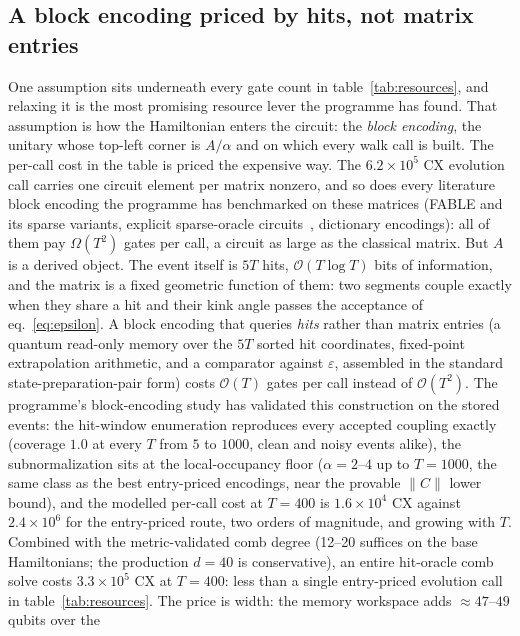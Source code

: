 \documentclass[11pt,a4paper]{article}
\begin{document}
\subsection{A block encoding priced by hits, not matrix entries}
\label{sec:limits:blockencoding}

One assumption sits underneath every gate count in
table~\ref{tab:resources}, and relaxing it is the most promising
resource lever the programme has found. That assumption is how the
Hamiltonian enters the circuit: the \emph{block encoding}, the
unitary whose top-left corner is $A/\alpha$ and on which every
walk call is built. The per-call cost in the table is priced the
expensive way. The
$6.2\times10^{5}$ CX evolution call carries one circuit element per matrix nonzero, and so does every literature block encoding the
programme has benchmarked on these matrices (FABLE and its sparse
variants, explicit sparse-oracle circuits~\cite{camps2023},
dictionary encodings): all of them pay $\Omega(T^{2})$ gates per
call, a circuit as large as the classical matrix. But $A$ is a
derived object. The event itself is $5T$ hits,
$\mathcal{O}(T\log T)$ bits of information, and the matrix is a
fixed geometric function of them: two segments couple exactly when
they share a hit and their kink angle passes the acceptance of
eq.~\eqref{eq:epsilon}. A block encoding that queries \emph{hits}
rather than matrix entries (a quantum read-only memory over the
$5T$ sorted hit coordinates, fixed-point extrapolation arithmetic,
and a comparator against $\varepsilon$, assembled in the standard
state-preparation-pair form) costs $\mathcal{O}(T)$ gates per
call instead of $\mathcal{O}(T^{2})$. The programme's
block-encoding study has validated this construction on the stored
events: the hit-window enumeration reproduces every accepted
coupling exactly (coverage $1.0$ at every $T$ from $5$ to $1000$,
clean and noisy events alike), the subnormalization sits at the
local-occupancy floor ($\alpha=2$--$4$ up to $T=1000$, the same
class as the best entry-priced encodings, near the provable
$\lVert C\rVert$ lower bound), and the modelled per-call cost at
$T=400$ is $1.6\times10^{4}$ CX against $2.4\times10^{6}$ for the entry-priced route, two orders of magnitude, and growing with
$T$. Combined with the metric-validated comb degree (12--20
suffices on the base Hamiltonians; the production $d=40$ is
conservative), an entire hit-oracle comb solve costs
$3.3\times10^{5}$ CX at $T=400$: less than a single entry-priced
evolution call in table~\ref{tab:resources}. The price is width:
the memory workspace adds $\approx47$--$49$ qubits over the
\end{document}
